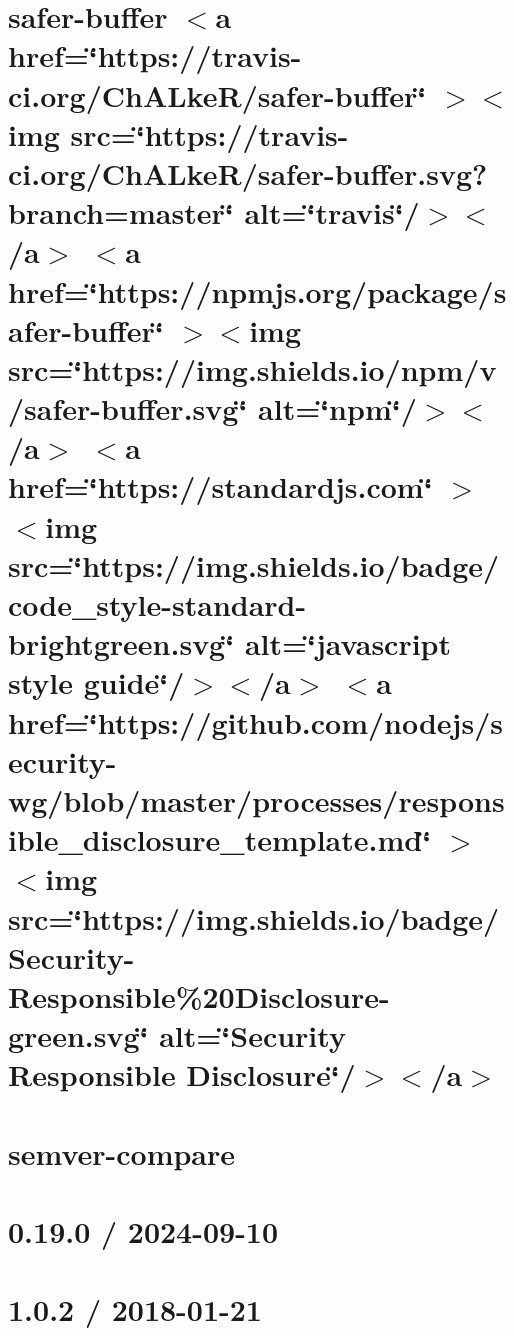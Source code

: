 \documentclass[twoside]{book}
\newcommand{\+}{\discretionary{\mbox{\scriptsize$\hookleftarrow$}}{}{}}
\begin{document}
\chapter{safer-\/buffer \texorpdfstring{$<$}{<}a href=\char`\"{}https\+://travis-\/ci.\+org/\+Ch\+ALke\+R/safer-\/buffer\char`\"{} \texorpdfstring{$>$}{>}\texorpdfstring{$<$}{<}img src=\char`\"{}https\+://travis-\/ci.\+org/\+Ch\+ALke\+R/safer-\/buffer.\+svg?branch=master\char`\"{} alt=\char`\"{}travis\char`\"{}/\texorpdfstring{$>$}{>}\texorpdfstring{$<$}{<}/a\texorpdfstring{$>$}{>} \texorpdfstring{$<$}{<}a href=\char`\"{}https\+://npmjs.\+org/package/safer-\/buffer\char`\"{} \texorpdfstring{$>$}{>}\texorpdfstring{$<$}{<}img src=\char`\"{}https\+://img.\+shields.\+io/npm/v/safer-\/buffer.\+svg\char`\"{} alt=\char`\"{}npm\char`\"{}/\texorpdfstring{$>$}{>}\texorpdfstring{$<$}{<}/a\texorpdfstring{$>$}{>} \texorpdfstring{$<$}{<}a href=\char`\"{}https\+://standardjs.\+com\char`\"{} \texorpdfstring{$>$}{>}\texorpdfstring{$<$}{<}img src=\char`\"{}https\+://img.\+shields.\+io/badge/code\+\_\+style-\/standard-\/brightgreen.\+svg\char`\"{} alt=\char`\"{}javascript style guide\char`\"{}/\texorpdfstring{$>$}{>}\texorpdfstring{$<$}{<}/a\texorpdfstring{$>$}{>} \texorpdfstring{$<$}{<}a href=\char`\"{}https\+://github.\+com/nodejs/security-\/wg/blob/master/processes/responsible\+\_\+disclosure\+\_\+template.\+md\char`\"{} \texorpdfstring{$>$}{>}\texorpdfstring{$<$}{<}img src=\char`\"{}https\+://img.\+shields.\+io/badge/\+Security-\/\+Responsible\%20\+Disclosure-\/green.\+svg\char`\"{} alt=\char`\"{}\+Security Responsible Disclosure\char`\"{}/\texorpdfstring{$>$}{>}\texorpdfstring{$<$}{<}/a\texorpdfstring{$>$}{>}}
\label{md_Backend_nodejs_node_modules_safer_buffer_Readme}

\chapter{semver-\/compare}
\label{md_Backend_nodejs_node_modules_semver_compare_readme}

\chapter{0.19.0 / 2024-\/09-\/10}
\label{md_Backend_nodejs_node_modules_send_HISTORY}

\chapter{1.0.2 / 2018-\/01-\/21}
\label{md_Backend_nodejs_node_modules_send_node_modules_encodeurl_HISTORY}

\end{document}
